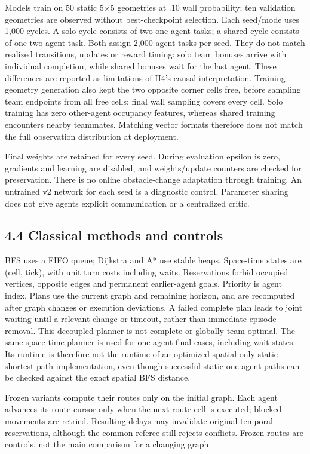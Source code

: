 \documentclass[10pt,a4paper]{article}
\begin{document}
Models train on 50 static 5×5 geometries at .10 wall probability; ten validation
geometries are observed without best-checkpoint selection. Each seed/mode uses
1,000 cycles. A solo cycle consists of two one-agent tasks; a shared cycle
consists of one two-agent task. Both assign 2,000 agent tasks per seed. They do
not match realized transitions, updates or reward timing: solo team bonuses
arrive with individual completion, while shared bonuses wait for the last agent.
These differences are reported as limitations of H4's causal interpretation.
Training geometry generation also kept the two opposite corner cells free,
before sampling team endpoints from all free cells; final wall sampling covers
every cell. Solo training has zero other-agent occupancy features, whereas shared
training encounters nearby teammates. Matching vector formats therefore does
not match the full observation distribution at deployment.

Final weights are retained for every seed. During evaluation epsilon is zero,
gradients and learning are disabled, and weights/update counters are checked
for preservation. There is no online obstacle-change adaptation through training.
An untrained v2 network for each seed is a diagnostic control. Parameter sharing
does not give agents explicit communication or a centralized critic.

\subsection*{4.4 Classical methods and controls}

BFS uses a FIFO queue; Dijkstra and A* use stable heaps. Space-time states are
(cell, tick), with unit turn costs including waits. Reservations forbid occupied
vertices, opposite edges and permanent earlier-agent goals. Priority is agent
index. Plans use the current graph and remaining horizon, and are recomputed
after graph changes or execution deviations. A failed complete plan leads to
joint waiting until a relevant change or timeout, rather than immediate episode
removal. This decoupled planner is not complete or globally team-optimal.
The same space-time planner is used for one-agent final cases, including wait
states. Its runtime is therefore not the runtime of an optimized spatial-only
static shortest-path implementation, even though successful static one-agent
paths can be checked against the exact spatial BFS distance.

Frozen variants compute their routes only on the initial graph. Each agent
advances its route cursor only when the next route cell is executed; blocked
movements are retried. Resulting delays may invalidate original temporal
reservations, although the common referee still rejects conflicts. Frozen
routes are controls, not the main comparison for a changing graph.
\end{document}

